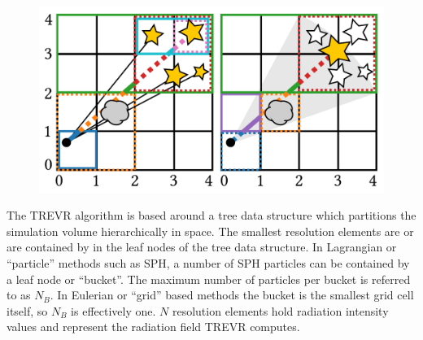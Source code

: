 \documentclass[fleq,usenatbib]{mnras}
\newcommand{\acro}{TREVR}
\begin{document}
\begin{figure}
\includegraphics[width=1\linewidth]{Figures/algorithm.pdf}
\caption{}
\label{fig:algorithm}
\end{figure}
The \acro{} algorithm is based around a tree data structure which partitions 
the simulation volume hierarchically in space. The smallest resolution 
elements are or are contained by in the leaf nodes of the tree data structure. 
In Lagrangian or ``particle'' methods such as SPH, a number of SPH particles 
can be contained by a leaf node or ``bucket''. The maximum number of particles 
per bucket is referred to as $N_B$. In Eulerian or ``grid'' based methods the 
bucket is the smallest grid cell itself, so $N_B$ is effectively one. $N$ 
resolution elements hold radiation intensity values and represent the 
radiation field \acro{} computes. 
\end{document}
